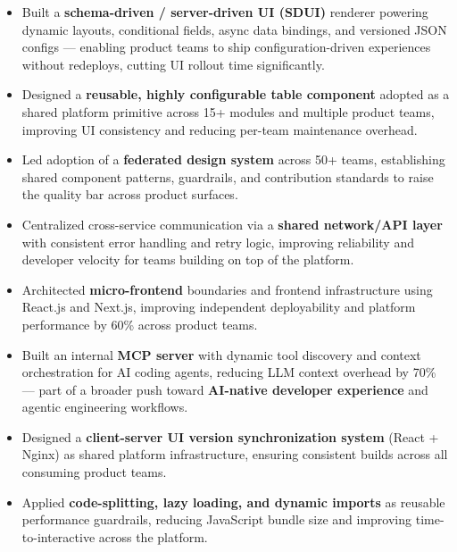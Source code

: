 \documentclass[100pt,a4paper]{article}
\begin{document}
\begin{itemize}
\vspace{2pt}

\item {Built a \textbf{schema-driven / server-driven UI (SDUI)} renderer powering dynamic layouts, conditional fields, async data bindings, and versioned JSON configs — enabling product teams to ship configuration-driven experiences without redeploys, cutting UI rollout time significantly.}
\item {Designed a \textbf{reusable, highly configurable table component} adopted as a shared platform primitive across 15+ modules and multiple product teams, improving UI consistency and reducing per-team maintenance overhead.}
\item {Led adoption of a \textbf{federated design system} across 50+ teams, establishing shared component patterns, guardrails, and contribution standards to raise the quality bar across product surfaces.}
\item {Centralized cross-service communication via a \textbf{shared network/API layer} with consistent error handling and retry logic, improving reliability and developer velocity for teams building on top of the platform.}
\item {Architected \textbf{micro-frontend} boundaries and frontend infrastructure using React.js and Next.js, improving independent deployability and platform performance by 60\% across product teams.}
\item {Built an internal \textbf{MCP server} with dynamic tool discovery and context orchestration for AI coding agents, reducing LLM context overhead by 70\% — part of a broader push toward \textbf{AI-native developer experience} and agentic engineering workflows.}
\item {Designed a \textbf{client-server UI version synchronization system} (React + Nginx) as shared platform infrastructure, ensuring consistent builds across all consuming product teams.}
\item {Applied \textbf{code-splitting, lazy loading, and dynamic imports} as reusable performance guardrails, reducing JavaScript bundle size and improving time-to-interactive across the platform.}


\end{itemize}
\end{document}
